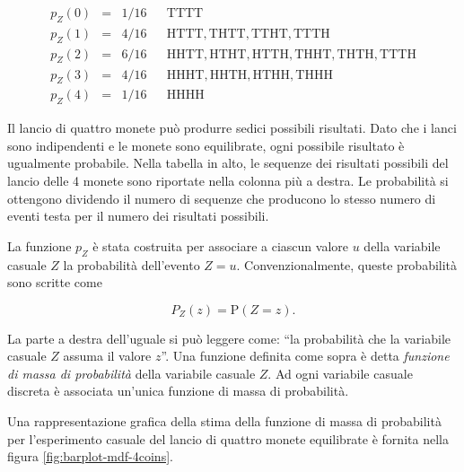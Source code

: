 \documentclass[
  11pt,
]{krantz}
\theoremstyle{definition}
\theoremstyle{definition}
\theoremstyle{definition}
\theoremstyle{definition}
\theoremstyle{remark}
\begin{document}
\[
\begin{array}{rclll}
p_Z(0) & = & 1/16 & & \mathrm{TTTT}
\\
p_Z(1) & = & 4/16 & & \mathrm{HTTT, THTT, TTHT, TTTH}
\\
p_Z(2) & = & 6/16 & & \mathrm{HHTT, HTHT, HTTH, THHT, THTH, TTTH}
\\
p_Z(3) & = & 4/16 & & \mathrm{HHHT, HHTH, HTHH, THHH}
\\
p_Z(4) & = & 1/16 & & \mathrm{HHHH}
\end{array}
\]

Il lancio di quattro monete può produrre sedici possibili risultati. Dato che i lanci sono indipendenti e le monete sono equilibrate, ogni possibile risultato è ugualmente probabile. Nella tabella in alto, le sequenze dei risultati possibili del lancio delle 4 monete sono riportate nella colonna più a destra. Le probabilità si ottengono dividendo il numero di sequenze che producono lo stesso numero di eventi testa per il numero dei risultati possibili.

La funzione \(p_Z\) è stata costruita per associare a ciascun valore \(u\) della variabile casuale \(Z\) la probabilità dell'evento \(Z = u\). Convenzionalmente, queste probabilità sono scritte come

\[
P_Z(z) = \mbox{P}(Z = z).
\]

La parte a destra dell'uguale si può leggere come: ``la probabilità che la variabile casuale \(Z\) assuma il valore \(z\)''. Una funzione definita come sopra è detta \emph{funzione di massa di probabilità} della variabile casuale \(Z\). Ad ogni variabile casuale discreta è associata un'unica funzione di massa di probabilità.

Una rappresentazione grafica della stima della funzione di massa di probabilità per l'esperimento casuale del lancio di quattro monete equilibrate è fornita nella figura \ref{fig:barplot-mdf-4coins}.
\end{document}
